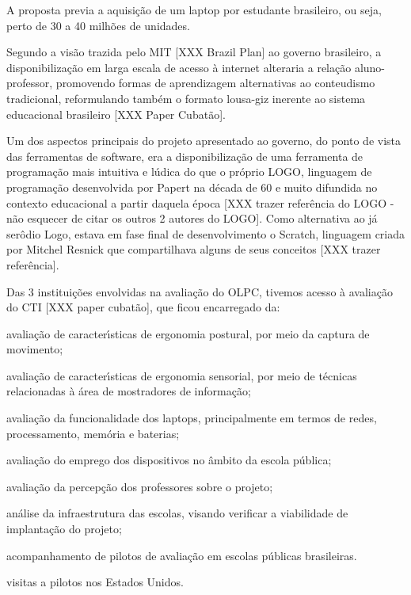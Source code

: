 \documentclass[
12pt,		%
openright,	%
twoside,  %
a4paper,			%
chapter=TITLE,		%
english,			%
french,				%
spanish,			%
brazil				%
]{USPSC-classe/USPSC_RedarTex}
\begin{document}
A proposta previa a aquisi\c{c}\~ao de um \textquotedbl laptop por estudante brasileiro, ou seja, perto de 30 a 40 milh\~oes de unidades.








Segundo a vis\~ao trazida pelo MIT [XXX Brazil Plan] ao governo brasileiro, a disponibiliza\c{c}\~ao em larga escala de acesso \`a internet alteraria a rela\c{c}\~ao aluno-professor, promovendo formas de aprendizagem alternativas ao conteudismo tradicional, reformulando tamb\'em o formato lousa-giz inerente ao sistema educacional brasileiro [XXX Paper Cubat\~ao].








Um dos aspectos principais do projeto apresentado ao governo, do ponto de vista das ferramentas de software, era a disponibiliza\c{c}\~ao de uma ferramenta de programa\c{c}\~ao mais intuitiva e l\'udica do que o pr\'oprio LOGO, linguagem de programa\c{c}\~ao desenvolvida por Papert na d\'ecada de 60 e muito difundida no contexto educacional a partir daquela \'epoca [XXX trazer refer\^encia do LOGO - n\~ao esquecer de citar os outros 2 autores do LOGO]. Como alternativa ao j\'a ser\^odio Logo, estava em fase final de desenvolvimento o Scratch, linguagem criada por Mitchel Resnick que compartilhava alguns de seus conceitos [XXX trazer refer\^encia].








Das 3 institui\c{c}\~oes envolvidas na avalia\c{c}\~ao do OLPC, tivemos acesso \`a avalia\c{c}\~ao do CTI [XXX paper cubat\~ao], que ficou encarregado da:









\begin{alineas}
\item avalia\c{c}\~ao de caracter\'{\i}sticas de ergonomia postural, por meio da captura de movimento;
\item avalia\c{c}\~ao de caracter\'{\i}sticas de ergonomia sensorial, por meio de t\'ecnicas relacionadas \`a \'area de mostradores de informa\c{c}\~ao;
\item avalia\c{c}\~ao da funcionalidade dos \textquotedbl laptops, principalmente em termos de redes, processamento, mem\'oria e baterias;
\item avalia\c{c}\~ao do emprego dos dispositivos no \^ambito da escola p\'ublica;
\item avalia\c{c}\~ao da percep\c{c}\~ao dos professores sobre o projeto;
\item an\'alise da infraestrutura das escolas, visando verificar a viabilidade de implanta\c{c}\~ao do projeto;
\item acompanhamento de pilotos de avalia\c{c}\~ao em escolas p\'ublicas brasileiras.
\item visitas a pilotos nos Estados Unidos.
\end{alineas}
\end{document}
